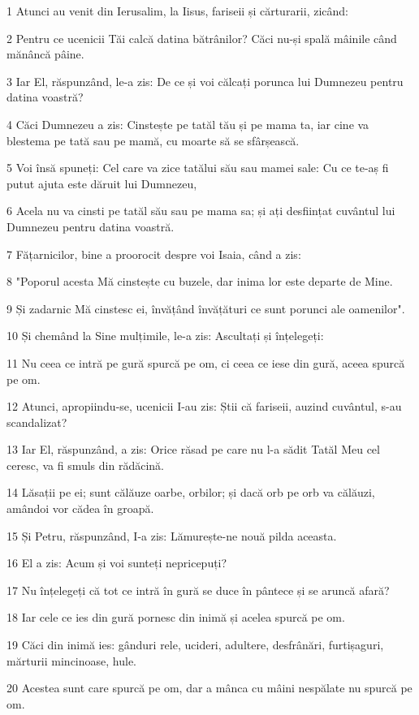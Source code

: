 \par 1 Atunci au venit din Ierusalim, la Iisus, fariseii și cărturarii, zicând:
\par 2 Pentru ce ucenicii Tăi calcă datina bătrânilor? Căci nu-și spală mâinile când mănâncă pâine.
\par 3 Iar El, răspunzând, le-a zis: De ce și voi călcați porunca lui Dumnezeu pentru datina voastră?
\par 4 Căci Dumnezeu a zis: Cinstește pe tatăl tău și pe mama ta, iar cine va blestema pe tată sau pe mamă, cu moarte să se sfârșească.
\par 5 Voi însă spuneți: Cel care va zice tatălui său sau mamei sale: Cu ce te-aș fi putut ajuta este dăruit lui Dumnezeu,
\par 6 Acela nu va cinsti pe tatăl său sau pe mama sa; și ați desființat cuvântul lui Dumnezeu pentru datina voastră.
\par 7 Fățarnicilor, bine a proorocit despre voi Isaia, când a zis:
\par 8 "Poporul acesta Mă cinstește cu buzele, dar inima lor este departe de Mine.
\par 9 Și zadarnic Mă cinstesc ei, învățând învățături ce sunt porunci ale oamenilor".
\par 10 Și chemând la Sine mulțimile, le-a zis: Ascultați și înțelegeți:
\par 11 Nu ceea ce intră pe gură spurcă pe om, ci ceea ce iese din gură, aceea spurcă pe om.
\par 12 Atunci, apropiindu-se, ucenicii I-au zis: Știi că fariseii, auzind cuvântul, s-au scandalizat?
\par 13 Iar El, răspunzând, a zis: Orice răsad pe care nu l-a sădit Tatăl Meu cel ceresc, va fi smuls din rădăcină.
\par 14 Lăsații pe ei; sunt călăuze oarbe, orbilor; și dacă orb pe orb va călăuzi, amândoi vor cădea în groapă.
\par 15 Și Petru, răspunzând, I-a zis: Lămurește-ne nouă pilda aceasta.
\par 16 El a zis: Acum și voi sunteți nepricepuți?
\par 17 Nu înțelegeți că tot ce intră în gură se duce în pântece și se aruncă afară?
\par 18 Iar cele ce ies din gură pornesc din inimă și acelea spurcă pe om.
\par 19 Căci din inimă ies: gânduri rele, ucideri, adultere, desfrânări, furtișaguri, mărturii mincinoase, hule.
\par 20 Acestea sunt care spurcă pe om, dar a mânca cu mâini nespălate nu spurcă pe om.
